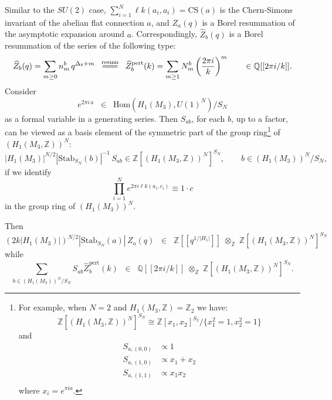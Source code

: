 \documentclass[hyper,letterpaper]{JHEP3}
\newcommand{\Z}{{\mathbb Z}}
\newcommand{\Q}{{\mathbb Q}}
\renewcommand{\hat}{\widehat}
\def\lk{{\ell k}}
\begin{document}
Similar to  the $SU(2)$ case, $\sum_{i=1}^N\lk(a_i,a_i)=\mathrm{CS}(a)$ is the Chern-Simons invariant of the abelian flat connection $a$, and $Z_a(q)$ is a Borel resummation \cite{Gukov:2016njj} of the asymptotic expansion around $a$. Correspondingly, $\hat{Z}_b(q)$ is a Borel resummation of the series of the following type:
\begin{equation}
	\hat{Z}_b(q)=\sum_{m\geq 0}n^b_m\,q^{\Delta_b+m}\;\;\stackrel{\text{resum}}{=\joinrel=\joinrel=}\;\; \hat{Z}^\text{pert}_b(k)
=\sum_{m\geq 1} N^b_m\left(\frac{2\pi i}{k}\right)^m
	\qquad \in\Q[[2\pi i/k]].
	\label{resum}
\end{equation}
Consider
\begin{equation}
	e^{2\pi i\,a}\;\;\in \;\;\mathrm{Hom}\left(H_1(M_3),U(1)^N\right)/S_N
\end{equation}
as a formal variable in a generating series. Then $S_{ab}$, for each $b$, up to a factor, can be viewed as a basis element of the symmetric part of the group ring\footnote{For example, when $N=2$ and $H_1(M_3,\Z)=\Z_2$ we have:
\begin{equation}
	\Z\left[\left(H_1(M_3,\Z)\right)^N\right]^{S_N}\cong
	\Z[x_1,x_2]^{S_2}/\{x_1^2=1,x_2^2=1\}
\end{equation}
and
\begin{equation}
	\begin{array}{rl}
		S_{a,(0,0)} & \propto 1 \\
		S_{a,(1,0)} & \propto x_1+x_2 \\
		S_{a,(1,1)} & \propto x_1x_2 \\
	\end{array}
\end{equation}
where $x_i=e^{\pi i a}$.
}
 of $(H_1(M_3,\Z))^N$:
\begin{equation}
	|H_1(M_3)|^{N/2}|\text{Stab}_{S_N}(b)|^{-1}\,S_{ab}\in
	\Z\left[\left(H_1(M_3,\Z)\right)^N\right]^{S_N},\qquad b\in (H_1(M_3))^N/S_N,
	\label{group-ring-basis}
\end{equation}
if we identify
\begin{equation}
	\prod_{i=1}^Ne^{2\pi i\lk(a_i,c_i)}\equiv 1\cdot c
	\label{ring-id}
\end{equation}
in the group ring of $(H_1(M_3))^N$.


Then
\begin{equation}
	\left(2k|H_1(M_3)|\right)^{N/2}\left|\text{Stab}_{S_N}(a)\right|\,Z_a(q)\;\;\in\;\;
	\Z[[q^{1/|H_1|}]]\;\otimes_\Z\;
	\Z\left[\left(H_1(M_3,\Z)\right)^N\right]^{S_N}
	\label{Zq}
\end{equation}
while
\begin{equation}
	\sum_{b\in (H_1(M_3))^N/S_N}S_{ab}\hat{Z}^\text{pert}_b(k)\;\;
	\in\;\;
		\Q[[2\pi i/k]]\;\otimes_\Z\;
		\Z\left[\left(H_1(M_3,\Z)\right)^N\right]^{S_N}.
		\label{Zk}
\end{equation}
\end{document}

